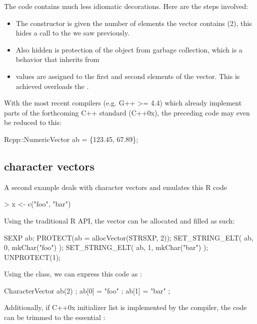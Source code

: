 The code contains much less idiomatic decorations. Here are the steps involved: 
\begin{itemize}
\item The  constructor is given the number
of elements the vector contains (2), this hides a call to the 
 we saw previously. 
\item Also hidden is protection of the 
object from garbage collection, which is a behavior that 
inherits from 
\item values are assigned to the first and second elements of the vector. 
This is achieved  overloads the .
\end{itemize}

With the most recent compilers (e.g. G++ >= 4.4) which already implement
parts of the forthcoming C++ standard (C++0x), the preceding code may even be
reduced to this:

\begin{example}
Rcpp::NumericVector ab = \{123.45, 67.89\};
\end{example}

\subsection{character vectors}

A second example deals with character vectors and emulates this R code

\begin{example}
> x <- c("foo", "bar")
\end{example}

Using the traditional R API, the vector can be allocated and filled as such:

\begin{example}
SEXP ab;
PROTECT(ab = allocVector(STRSXP, 2));
SET_STRING_ELT( ab, 0, mkChar("foo") );
SET_STRING_ELT( ab, 1, mkChar("bar") );
UNPROTECT(1);
\end{example}

Using the  class, we can express this code as : 

\begin{example}
CharacterVector ab(2) ;
ab[0] = "foo" ;
ab[1] = "bar" ;
\end{example}

Additionally, if C++0x initializer list is implemented by the compiler, the 
code can be trimmed to the essential :

